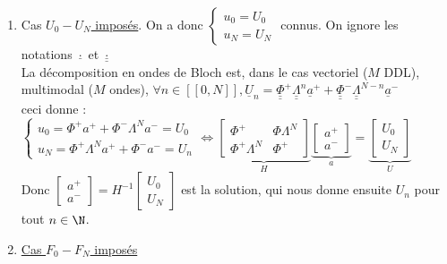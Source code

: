 \documentclass[12pt,a4paper]{article}
\begin{document}
	\begin{enumerate}
		\item Cas \underline{$U_0-U_N$ imposés}. On a donc $\begin{cases}
			u_0 = U_0\\
			u_N = U_N
		\end{cases}$ connus. On ignore les notations $\underline{\cdot}$ et $\underline{\underline{\cdot}}$\\
		La décomposition en ondes de Bloch est, dans le cas vectoriel ($M$ DDL), multimodal ($M$ ondes), $\forall n \in [\![0,N]\!], \underline{U}_n = \underline{\underline{\Phi}}^+\underline{\underline{\Lambda}}^n\underline{a}^+ + \underline{\underline{\Phi}}^-\underline{\underline{\Lambda}}^{N-n}\underline{a}^-$\\
		ceci donne : $\begin{cases}
			u_0 = \Phi^+ a^+ + \Phi^-\Lambda^N a^- = U_0 \\
			u_N = \Phi^+ \Lambda^N a^+ + \Phi^- a^- = U_n
		\end{cases}\iff \underbrace{\begin{bmatrix}
		\Phi^+ & \Phi \Lambda^N \\
		\Phi^+\Lambda^N & \Phi^+
		\end{bmatrix}}_H\underbrace{\begin{bmatrix}
		a^+ \\ a^-
		\end{bmatrix}}_{a} = \underbrace{\begin{bmatrix}
		U_0 \\ U_N
		\end{bmatrix}}_{U}$\\
	
		Donc $\begin{bmatrix}
			a^+ \\ a^-
		\end{bmatrix} = H^{-1}\begin{bmatrix}
		U_0 \\ U_N
		\end{bmatrix}$ est la solution, qui nous donne ensuite $U_n$ pour tout $n \in \N$.
		
		\newpage
		
		\item \underline{Cas $F_0 - F_N$ imposés}
		

\end{enumerate}
\end{document}
